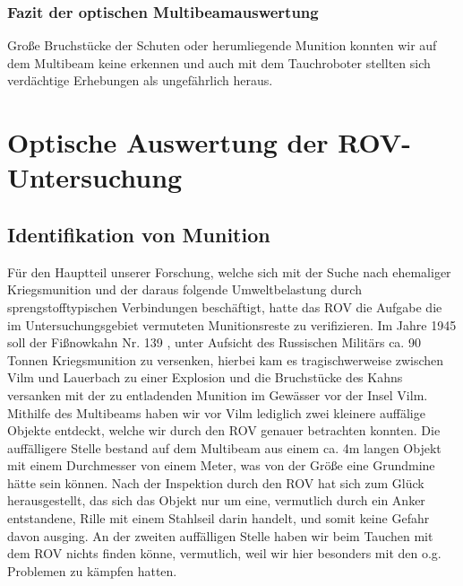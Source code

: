 \subsubsection{Fazit der optischen Multibeamauswertung}
Große Bruchstücke der Schuten oder herumliegende Munition konnten wir auf dem Multibeam keine erkennen und auch mit dem Tauchroboter stellten sich verdächtige Erhebungen als ungefährlich heraus. \\

\section{Optische Auswertung der ROV-Untersuchung}
\subsection{Identifikation von Munition}
Für den Hauptteil unserer Forschung, welche sich mit der Suche nach ehemaliger Kriegsmunition und der daraus folgende Umweltbelastung durch sprengstofftypischen Verbindungen beschäftigt,
hatte das ROV die Aufgabe die im Untersuchungsgebiet vermuteten Munitionsreste zu verifizieren. 
Im Jahre 1945 soll der Fißnowkahn Nr. 139 , unter Aufsicht des Russischen Militärs ca. 90 Tonnen Kriegsmunition zu versenken, hierbei kam es tragischwerweise zwischen Vilm und Lauerbach zu einer Explosion und die Bruchstücke des Kahns versanken mit der zu entladenden Munition im Gewässer vor der Insel Vilm.
Mithilfe des Multibeams haben wir vor Vilm lediglich zwei kleinere auffälige Objekte entdeckt, welche wir durch den ROV genauer betrachten konnten. Die auffälligere Stelle bestand auf dem Multibeam aus einem ca. 4m langen Objekt mit einem Durchmesser von einem Meter, was von der Größe eine Grundmine hätte sein können.
Nach der Inspektion durch den ROV hat sich zum Glück herausgestellt, das sich das Objekt nur um eine, vermutlich durch ein Anker entstandene, Rille mit einem Stahlseil darin handelt, und somit keine Gefahr davon ausging.
An der zweiten auffälligen Stelle haben wir beim Tauchen mit dem ROV nichts finden könne, vermutlich, weil wir hier besonders mit den o.g. Problemen zu kämpfen hatten. 

